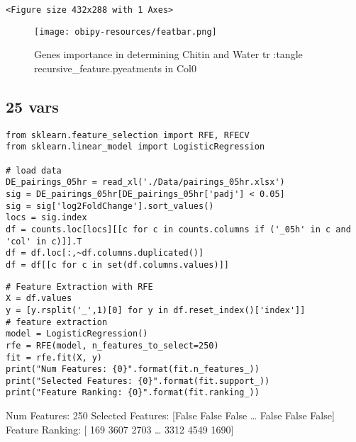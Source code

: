 \documentclass[a4paper]{article}
\begin{document}
\begin{verbatim}
<Figure size 432x288 with 1 Axes>
\end{verbatim}

\begin{figure}[htbp]
\centering
\texttt{[image: obipy-resources/featbar.png]}
\caption{\label{featbar}
Genes importance in determining Chitin and Water tr :tangle recursive\_feature.pyeatments in Col0}
\end{figure}


\subsection{25 vars}
\label{sec:org85b15b4}
\begin{verbatim}
from sklearn.feature_selection import RFE, RFECV
from sklearn.linear_model import LogisticRegression

# load data
DE_pairings_05hr = read_xl('./Data/pairings_05hr.xlsx')
sig = DE_pairings_05hr[DE_pairings_05hr['padj'] < 0.05]
sig = sig['log2FoldChange'].sort_values()
locs = sig.index
df = counts.loc[locs][[c for c in counts.columns if ('_05h' in c and 'col' in c)]].T
df = df.loc[:,~df.columns.duplicated()]
df = df[[c for c in set(df.columns.values)]]
\end{verbatim}

\begin{verbatim}
# Feature Extraction with RFE
X = df.values
y = [y.rsplit('_',1)[0] for y in df.reset_index()['index']]
# feature extraction
model = LogisticRegression()
rfe = RFE(model, n_features_to_select=250)
fit = rfe.fit(X, y)
print("Num Features: {0}".format(fit.n_features_))
print("Selected Features: {0}".format(fit.support_))
print("Feature Ranking: {0}".format(fit.ranking_))
\end{verbatim}

Num Features: 250
Selected Features: [False False False \ldots{} False False False]
Feature Ranking: [ 169 3607 2703 \ldots{} 3312 4549 1690]
\end{document}
